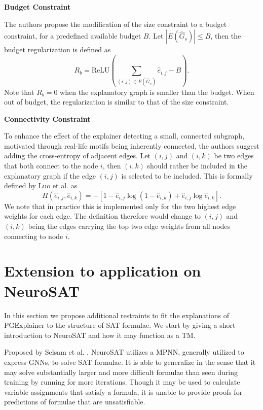 \textbf{Budget Constraint}\par
The authors propose the modification of the size constraint to a budget constraint, for a predefined available budget $B$. Let $|E(\hat{G}_s)| \leq B$, then the budget regularization is defined as
\begin{equation}
    R_b = \text{ReLU}(\sum_{(i,j)\in E(\hat{G}_s)}\hat{e}_{i,j}-B).
\end{equation}
Note that $R_b = 0$ when the explanatory graph is smaller than the budget. When out of budget, the regularization is similar to that of the size constraint. \bigskip

\textbf{Connectivity Constraint}\par
To enhance the effect of the explainer detecting a small, connected subgraph, motivated through real-life motifs being inherently connected, the authors suggest adding the cross-entropy of adjacent edges. Let $(i,j)$ and $(i,k)$ be two edges that both connect to the node $i$, then $(i,k)$ should rather be included in the explanatory graph if the edge $(i,j)$ is selected to be included. This is formally defined by Luo et al. \cite{luo2020parameterized} as
\begin{equation}
    H(\hat{e}_{i,j},\hat{e}_{i,k}) = -[1-\hat{e}_{i,j}\log(1-\hat{e}_{i,k})+\hat{e}_{i,j}\log \hat{e}_{i,k}].
\end{equation}
We note that in practice this is implemented only for the two highest edge weights for each edge. The definition therefore would change to $(i,j)$ and $(i,k)$ being the edges carrying the top two edge weights from all nodes connecting to node $i$.


\section{Extension to application on NeuroSAT}
\label{sec:NeuroSAT_extension}
In this section we propose additional restraints to fit the explanations of PGExplainer to the structure of SAT formulae. We start by giving a short introduction to NeuroSAT\cite{selsam2018learning} and how it may function as a \ac{TM}.\bigskip

Proposed by Selsam et al. \cite{selsam2018learning}, NeuroSAT utilizes a MPNN, generally utilized to express GNNs, to solve SAT formulae. It is able to generalize in the sense that it may solve substantially larger and more difficult formulae than seen during training by running for more iterations. Though it may be used to calculate variable assignments that satisfy a formula, it is unable to provide proofs for predictions of formulae that are unsatisfiable. \bigskip

